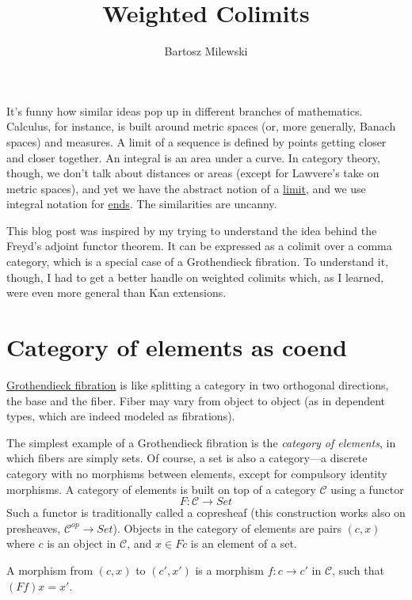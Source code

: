 \documentclass[11pt]{amsart}
\author{Bartosz Milewski}
\title{Weighted Colimits}
\begin{document}
\maketitle{}

It's funny how similar ideas pop up in different branches of mathematics. Calculus, for instance, is built around metric spaces (or, more generally, Banach spaces) and measures. A limit of a sequence is defined by points getting closer and closer together. An integral is an area under a curve. In category theory, though, we don't talk about distances or areas (except for Lawvere's take on metric spaces), and yet we have the abstract notion of a \href{https://bartoszmilewski.com/2015/04/15/limits-and-colimits/}{limit}, and we use integral notation for \href{https://bartoszmilewski.com/2017/03/29/ends-and-coends/}{ends}. The similarities are uncanny. 

This blog post was inspired by my trying to understand the idea behind the Freyd's adjoint functor theorem. It can be expressed as a colimit over a comma category, which is a special case of a Grothendieck fibration. To understand it, though, I had to get a better handle on weighted colimits which, as I learned, were even more general than Kan extensions. 

\section{Category of elements as coend}

\href{https://bartoszmilewski.com/2019/10/09/fibrations-cleavages-and-lenses/}{Grothendieck fibration} is like splitting a category in two orthogonal directions, the base and the fiber. Fiber may vary from object to object (as in dependent types, which are indeed modeled as fibrations). 

The simplest example of a Grothendieck fibration is the \emph{category of elements}, in which fibers are simply sets. Of course, a set is also a category---a discrete category with no morphisms between elements, except for compulsory identity morphisms. A category of elements is built on top of a category $\mathcal{C}$ using a functor
\[F \colon \mathcal{C} \to Set\]
Such a functor is traditionally called a copresheaf (this construction works also on presheaves, $\mathcal{C}^{op} \to Set$). Objects in the category of elements are pairs $(c, x)$ where $c$ is an object in $\mathcal{C}$, and $x \in F c$ is an element of a set. 

A morphism from $(c, x)$ to $(c', x')$ is a morphism  $f \colon c \to c'$ in $\mathcal{C}$, such that $(F f) x = x'$.
\end{document}
